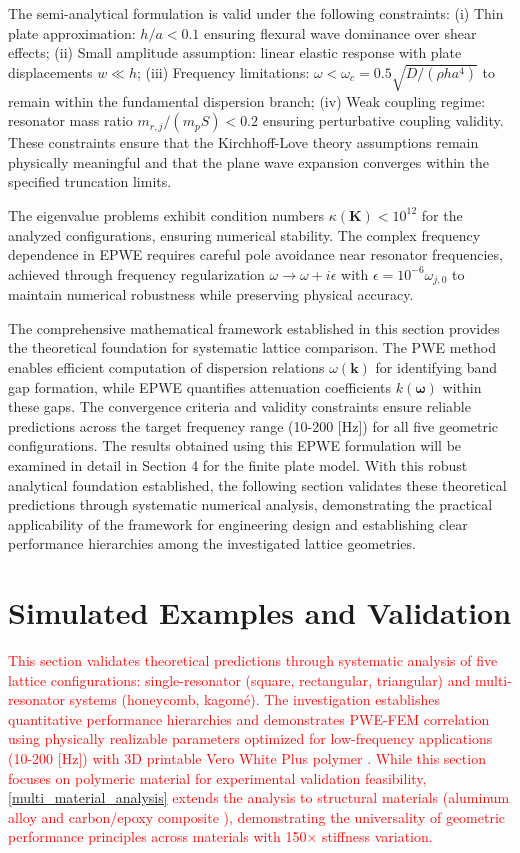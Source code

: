 \documentclass[review,numbers,sort&compress]{elsarticle}
\begin{document}
The semi-analytical formulation is valid under the following constraints: (i) Thin plate approximation: $h/a < 0.1$ ensuring flexural wave dominance over shear effects; (ii) Small amplitude assumption: linear elastic response with plate displacements $w \ll h$; (iii) Frequency limitations: $\omega < \omega_c = 0.5\sqrt{D/(\rho h a^4)}$ to remain within the fundamental dispersion branch; (iv) Weak coupling regime: resonator mass ratio $m_{r,j}/(m_p S) < 0.2$ ensuring perturbative coupling validity. These constraints ensure that the Kirchhoff-Love theory assumptions remain physically meaningful and that the plane wave expansion converges within the specified truncation limits.

The eigenvalue problems exhibit condition numbers $\kappa(\mathbf{K}) < 10^{12}$ for the analyzed configurations, ensuring numerical stability. The complex frequency dependence in EPWE requires careful pole avoidance near resonator frequencies, achieved through frequency regularization $\omega \to \omega + i\epsilon$ with $\epsilon = 10^{-6}\omega_{j,0}$ to maintain numerical robustness while preserving physical accuracy.

The comprehensive mathematical framework established in this section provides the theoretical foundation for systematic lattice comparison. The PWE method enables efficient computation of dispersion relations $\omega(\mathbf{k})$ for identifying band gap formation, while EPWE quantifies attenuation coefficients $k(\boldsymbol{\omega})$ within these gaps. The convergence criteria and validity constraints ensure reliable predictions across the target frequency range (10-200 [Hz]) for all five geometric configurations. The results obtained using this EPWE formulation will be examined in detail in Section 4 for the finite plate model. With this robust analytical foundation established, the following section validates these theoretical predictions through systematic numerical analysis, demonstrating the practical applicability of the framework for engineering design and establishing clear performance hierarchies among the investigated lattice geometries.

\section{Simulated Examples and Validation}\label{num_ex_disc}

\textcolor{red}{This section validates theoretical predictions through systematic analysis of five lattice configurations: single-resonator (square, rectangular, triangular) and multi-resonator systems (honeycomb, kagomé). The investigation establishes quantitative performance hierarchies and demonstrates PWE-FEM correlation using physically realizable parameters optimized for low-frequency applications (10-200 [Hz]) with 3D printable Vero White Plus polymer \cite{MIRANDA2019480}. While this section focuses on polymeric material for experimental validation feasibility, \ref{multi_material_analysis} extends the analysis to structural materials (aluminum alloy \cite{Xiao_2012} and carbon/epoxy composite \cite{CMH17_2012}), demonstrating the universality of geometric performance principles across materials with 150× stiffness variation.}
\end{document}
